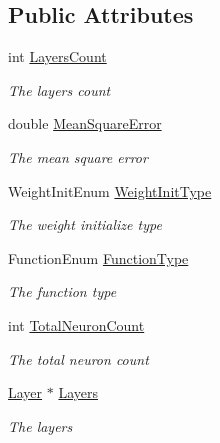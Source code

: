\subsection*{Public Attributes}
\begin{DoxyCompactItemize}
\item 
int \hyperlink{class_n_n_t_lib_1_1_neural_network_a279ecd5cdb00a4fd3485d7c1366d1ada}{Layers\+Count}
\begin{DoxyCompactList}\small\item\em The layers count \end{DoxyCompactList}\item 
double \hyperlink{class_n_n_t_lib_1_1_neural_network_aa81b59c0bab012cc65f37cfc8870fb7c}{Mean\+Square\+Error}
\begin{DoxyCompactList}\small\item\em The mean square error \end{DoxyCompactList}\item 
Weight\+Init\+Enum \hyperlink{class_n_n_t_lib_1_1_neural_network_aef757cbe4d01525f99125716f217135d}{Weight\+Init\+Type}
\begin{DoxyCompactList}\small\item\em The weight initialize type \end{DoxyCompactList}\item 
Function\+Enum \hyperlink{class_n_n_t_lib_1_1_neural_network_afe71db7f776309201ae3a793d1fcadf8}{Function\+Type}
\begin{DoxyCompactList}\small\item\em The function type \end{DoxyCompactList}\item 
int \hyperlink{class_n_n_t_lib_1_1_neural_network_aeb06dfbd4762d8ce321f7e21532bdad7}{Total\+Neuron\+Count}
\begin{DoxyCompactList}\small\item\em The total neuron count \end{DoxyCompactList}\item 
\hyperlink{class_n_n_t_lib_1_1_layer}{Layer} $\ast$ \hyperlink{class_n_n_t_lib_1_1_neural_network_aa0390db1a1aa19da2b9b205a4572eacd}{Layers}
\begin{DoxyCompactList}\small\item\em The layers \end{DoxyCompactList}\end{DoxyCompactItemize}
